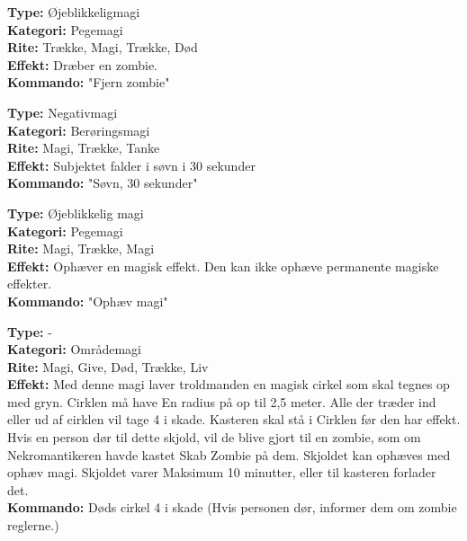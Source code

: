 \begin{primærMagi*}
\textbf{Type:} Øjeblikkeligmagi\\
\textbf{Kategori:} Pegemagi\\
\textbf{Rite:} Trække, Magi, Trække, Død\\
\textbf{Effekt:} Dræber en zombie.\\
\textbf{Kommando:} "Fjern zombie"
\end{primærMagi*}

\begin{primærMagi*}[Søvn]
\textbf{Type:} Negativmagi\\
\textbf{Kategori:} Berøringsmagi\\
\textbf{Rite:} Magi, Trække, Tanke\\
\textbf{Effekt:} Subjektet falder i søvn i 30 sekunder\\
\textbf{Kommando:} "Søvn, 30 sekunder"\\
\end{primærMagi*}

\begin{primærMagi*}
\textbf{Type:} Øjeblikkelig magi\\
\textbf{Kategori:} Pegemagi\\
\textbf{Rite:} Magi, Trække, Magi\\
\textbf{Effekt:} Ophæver en magisk effekt. Den kan ikke ophæve permanente magiske effekter.\\
\textbf{Kommando:} "Ophæv magi"
\end{primærMagi*}

\begin{primærMagi*}
\textbf{Type:} -\\
\textbf{Kategori:} Områdemagi \\
\textbf{Rite:} Magi, Give, Død, Trække, Liv \\
\textbf{Effekt:} Med denne magi laver troldmanden en magisk cirkel som skal tegnes op med gryn. Cirklen må have
En radius på op til 2,5 meter. Alle der træder ind eller ud af cirklen vil tage 4 i skade. Kasteren skal stå i Cirklen før den har effekt. Hvis en person dør til dette skjold, vil de blive gjort til en zombie, som om Nekromantikeren havde kastet Skab Zombie på dem. Skjoldet kan ophæves med ophæv magi. Skjoldet varer Maksimum 10 minutter, eller til kasteren forlader det.\\ 
\textbf{Kommando:} Døds cirkel 4 i skade (Hvis personen dør, informer dem om zombie reglerne.)
\end{primærMagi*}

